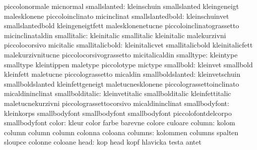                            piccolonormale            micnormal
             smallslanted: kleinschuin               smallslanted
                           kleingeneigt              malesklonene
                           piccoloinclinato          micinclinat
         smallslantedbold: kleinschuinvet            smallslantedbold
                           kleingeneigtfett          malesklonenetucne
                           piccoloinclinatograssetto micinclinataldin
              smallitalic: kleinitalic               smallitalic
                           kleinitalic               malekurzivni
                           piccolocorsivo            micitalic
          smallitalicbold: kleinitalicvet            smallitalicbold
                           kleinitalicfett           malekurzivnitucne
                           piccolocorsivograssetto   micitalicaldin
                smalltype: kleintype                 smalltype
                           kleintippen               maletype
                           piccolotype               mictype
                smallbold: kleinvet                  smallbold
                           kleinfett                 maletucne
                           piccolograssetto          micaldin
         smallboldslanted: kleinvetschuin            smallboldslanted
                           kleinfettgeneigt          maletucnesklonene
                           piccolograssettoinclinato micaldininclinat
          smallbolditalic: kleinvetitalic            smallbolditalic
                           kleinfettitalic           maletucnekurzivni
                           piccolograssettocorsivo   micaldininclinat
            smallbodyfont: kleinkorps                smallbodyfont
                           smallbodyfont             smallbodyfont
                           piccolofontdelcorpo       smallbodyfont %
                    color: kleur                     color
                           farbe                     barevne
                           colore                    culoare
                   column: kolom                     column
                           column                    column
                           colonna                   coloana %
                  columns: kolommen                  columns
                           spalten                   sloupce
                           colonne                   coloane
                     head: kop                       head
                           kopf                      hlavicka
                           testa                     antet %
